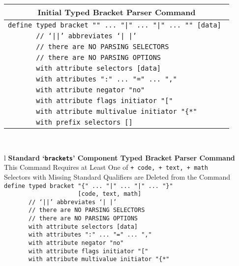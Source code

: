 \documentclass[12pt]{article}
\makeatletter
\newcommand{\TT}[1]{{\tt \bfseries #1}}
\newcommand{\ttkey}[1]{\TT{#1}\index{#1@\TT{#1}}}
\makeatother
\begin{document}
\begin{center}\label{TOP-LEVEL-{}}
\begin{tabular}{l}
\multicolumn{1}{c}{\bf Initial Typed Bracket Parser Command}
\\\hline
\tt define typed bracket "{" ... "|" ... "|" ... "}" [data] \\
\tt ~~~~~~~// `||' abbreviates `| |' \\
\tt ~~~~~~~// there are NO PARSING SELECTORS \\
\tt ~~~~~~~// there are NO PARSING OPTIONS \\
\tt ~~~~~~~with attribute selectors [data] \\
\tt ~~~~~~~with attributes ":" ... "=" ... "," \\
\tt ~~~~~~~with attribute negator "no" \\
\tt ~~~~~~~with attribute flags initiator "[" \\
\tt ~~~~~~~with attribute multivalue initiator "\{*" \\
\tt ~~~~~~~with prefix selectors [] \\
\end{tabular}
\\[2ex]
\begin{tabular}{l}
{\bf Standard `\ttkey{brackets}'\label{STANDARD-BRACKETS-2} Component
     Typed Bracket Parser Command}
\\[1ex]
{This Command Requires at Least One of {\tt + code, + text, + math}} \\
{Selectors with Missing Standard Qualifiers are Deleted from the Command}
\\[1ex]
\tt define typed bracket "\{" ... "|" ... "|" ... "\}" \\
\tt ~~~~~~~~~~~~~~~~~~~~~[code, text, math] \\
\tt ~~~~~~~// `||' abbreviates `| |' \\
\tt ~~~~~~~// there are NO PARSING SELECTORS \\
\tt ~~~~~~~// there are NO PARSING OPTIONS \\
\tt ~~~~~~~with attribute selectors [data] \\
\tt ~~~~~~~with attributes ":" ... "=" ... "," \\
\tt ~~~~~~~with attribute negator "no" \\
\tt ~~~~~~~with attribute flags initiator "[" \\
\tt ~~~~~~~with attribute multivalue initiator "\{*" \\
\end{tabular}
\end{center}
\end{document}
